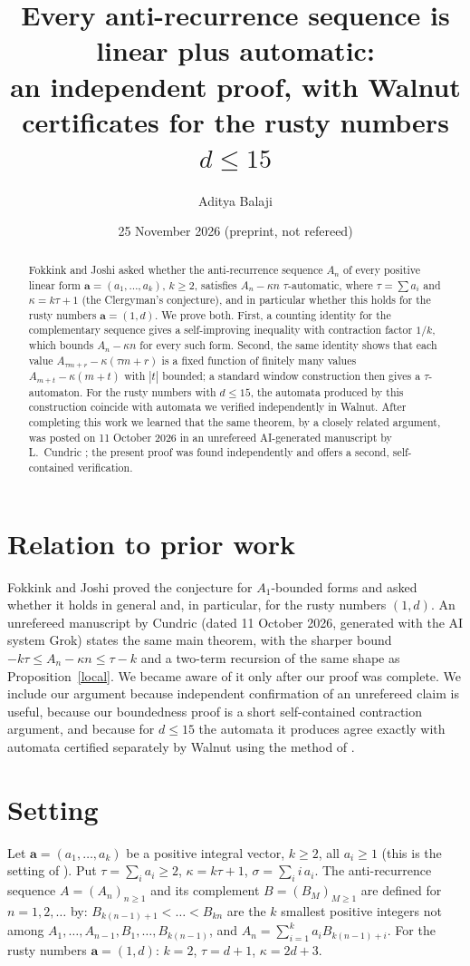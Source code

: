 \documentclass[11pt]{article}
\title{Every anti-recurrence sequence is linear plus automatic:\\ an independent proof, with Walnut certificates for the rusty numbers \(d\le15\)}
\author{Aditya Balaji}
\date{25 November 2026 \quad (preprint, not refereed)}
\theoremstyle{remark}\newtheorem{remark}[theorem]{Remark}
\theoremstyle{definition}\newtheorem{definition}[theorem]{Definition}
\begin{document}
\maketitle
\begin{abstract}
Fokkink and Joshi asked whether the anti-recurrence sequence \(A_n\) of every positive linear form \(\mathbf a=(a_1,\dots,a_k)\), \(k\ge2\), satisfies \(A_n-\kappa n\) \(\tau\)-automatic, where \(\tau=\sum a_i\) and \(\kappa=k\tau+1\) (the Clergyman's conjecture), and in particular whether this holds for the rusty numbers \(\mathbf a=(1,d)\). We prove both. First, a counting identity for the complementary sequence gives a self-improving inequality with contraction factor \(1/k\), which bounds \(A_n-\kappa n\) for every such form. Second, the same identity shows that each value \(A_{\tau m+r}-\kappa(\tau m+r)\) is a fixed function of finitely many values \(A_{m+t}-\kappa(m+t)\) with \(|t|\) bounded; a standard window construction then gives a \(\tau\)-automaton. For the rusty numbers with \(d\le15\), the automata produced by this construction coincide with automata we verified independently in Walnut. After completing this work we learned that the same theorem, by a closely related argument, was posted on 11 October 2026 in an unrefereed AI-generated manuscript by L.~Cundric \cite{cundric}; the present proof was found independently and offers a second, self-contained verification.
\end{abstract}

\section*{Relation to prior work}
Fokkink and Joshi \cite{fj} proved the conjecture for \(A_1\)-bounded forms and asked whether it holds in general and, in particular, for the rusty numbers \((1,d)\). An unrefereed manuscript by Cundric \cite{cundric} (dated 11 October 2026, generated with the AI system Grok) states the same main theorem, with the sharper bound \(-k\tau\le A_n-\kappa n\le\tau-k\) and a two-term recursion of the same shape as Proposition~\ref{local}. We became aware of it only after our proof was complete. We include our argument because independent confirmation of an unrefereed claim is useful, because our boundedness proof is a short self-contained contraction argument, and because for \(d\le15\) the automata it produces agree exactly with automata certified separately by Walnut using the method of \cite[Thm.~5]{fj}.

\section{Setting}
Let \(\mathbf a=(a_1,\dots,a_k)\) be a positive integral vector, \(k\ge 2\), all \(a_i\ge1\) (this is the setting of \cite[\S1]{fj}). Put \(\tau=\sum_i a_i\ge2\), \(\kappa=k\tau+1\), \(\sigma=\sum_i i\,a_i\).
The anti-recurrence sequence \(A=(A_n)_{n\ge1}\) and its complement \(B=(B_M)_{M\ge1}\) are defined for \(n=1,2,\dots\) by: \(B_{k(n-1)+1}<\dots<B_{kn}\) are the \(k\) smallest positive integers not among \(A_1,\dots,A_{n-1},B_1,\dots,B_{k(n-1)}\), and \(A_n=\sum_{i=1}^k a_iB_{k(n-1)+i}\).
For the rusty numbers \(\mathbf a=(1,d)\): \(k=2\), \(\tau=d+1\), \(\kappa=2d+3\).
\end{document}
